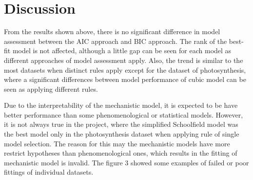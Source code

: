 \section{Discussion}

%
%

  From the results shown above, there is no significant difference in model assessment between the AIC approach and BIC approach. The rank of the best-fit model is not affected, although a little gap can be seen for each model as different approaches of model assessment apply.  Also, the trend is similar to the most datasets when distinct rules apply except for the dataset of photosynthesis, where a significant differences between model performance of cubic model can be seen as applying different rules.

  Due to the interpretability of the mechanistic model, it is expected to be have better performance than some phenomenological or statistical models. However, it is not always true in the project, where the simplified Schoolfield model was the best model only in the photosynthesis dataset when applying rule of single model selection. The reason for this may the mechanistic models have more restrict hypotheses than phenomenological ones, which results in the fitting of mechanistic model is invalid. The figure 3 showed some examples of failed or poor fittings of individual datasets.

